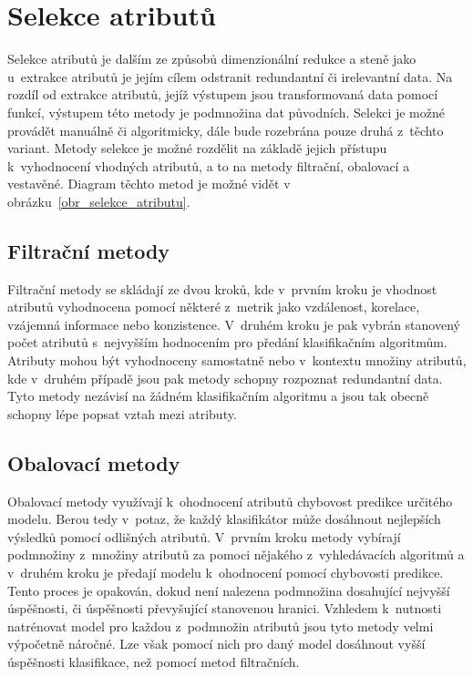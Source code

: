 \section{Selekce atributů}
\label{selekce_atributu}
Selekce atributů je dalším ze způsobů dimenzionální redukce a steně jako u~extrakce atributů je jejím cílem odstranit redundantní či irelevantní data. Na rozdíl od extrakce atributů, jejíž výstupem jsou transformovaná data pomocí funkcí, výstupem této metody je podmnožina dat původních. Selekci je možné provádět manuálně či algoritmicky, dále bude rozebrána pouze druhá z~těchto variant. Metody selekce je možné rozdělit na základě jejich přístupu k~vyhodnocení vhodných atributů, a to na metody filtrační, obalovací a vestavěné. Diagram těchto metod je možné vidět v obrázku~\ref{obr_selekce_atributu}.\cite{data_classification}\cite{aca}

\subsection*{Filtrační metody}
\label{filtracni_metody}
Filtrační metody se skládají ze dvou kroků, kde v~prvním kroku je vhodnost atributů vyhodnocena pomocí některé z~metrik jako vzdálenost, korelace, vzájemná informace nebo konzistence. V~druhém kroku je pak vybrán stanovený počet atributů s~nejvyšším hodnocením pro předání klasifikačním algoritmům. Atributy mohou být vyhodnoceny samostatně nebo v~kontextu množiny atributů, kde v~druhém případě jsou pak metody schopny rozpoznat redundantní data. Tyto metody nezávisí na žádném klasifikačním algoritmu a jsou tak obecně schopny lépe popsat vztah mezi atributy.\cite{data_classification}\cite{data_preprocessing}\cite{aca}

\subsection*{Obalovací metody}
\label{obalovaci_metody}
Obalovací metody využívají k~ohodnocení atributů chybovost predikce určitého modelu. Berou tedy v~potaz, že každý klasifikátor může dosáhnout nejlepších výsledků pomocí odlišných atributů. V~prvním kroku metody vybírají podmnožiny z~množiny atributů za pomoci nějakého z~vyhledávacích algoritmů a v~druhém kroku je předají modelu k~ohodnocení pomocí chybovosti predikce. Tento proces je opakován, dokud není nalezena podmnožina dosahující nejvyšší úspěšnosti, či úspěšnosti převyšující stanovenou hranici. Vzhledem k~nutnosti natrénovat model pro každou z~podmnožin atributů jsou tyto metody velmi výpočetně náročné. Lze však pomocí nich pro daný model dosáhnout vyšší úspěšnosti klasifikace, než pomocí metod filtračních.\cite{data_classification}\cite{data_preprocessing}\cite{aca}

